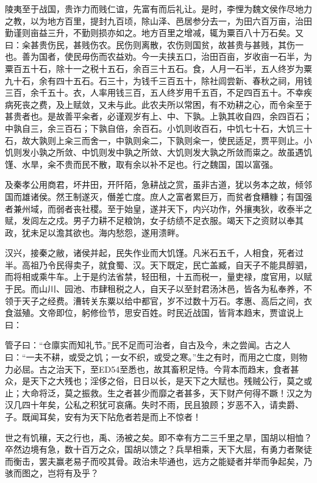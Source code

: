 \documentclass[]{article}
\begin{document}
陵夷至于战国，贵诈力而贱仁谊，先富有而后礼让。是时，李悝为魏文侯作尽地力之教，以为地方百里，提封九百顷，除山泽、邑居参分去一，为田六百万亩，治田勤谨则亩益三升，不勤则损亦如之。地方百里之增减，辄为粟百八十万石矣。又曰：籴甚贵伤民，甚贱伤农。民伤则离散，农伤则国贫，故甚贵与甚贱，其伤一也。善为国者，使民毋伤而农益劝。今一夫挟五口，治田百亩，岁收亩一石半，为粟百五十石，除十一之税十五石，余百三十五石。食，人月一石半，五人终岁为粟九十石，余有四十五石。石三十，为钱千三百五十，除社闾尝新、春秋之祠，用钱三百，余千五十。衣，人率用钱三百，五人终岁用千五百，不足四百五十。不幸疾病死丧之费，及上赋敛，又未与此。此农夫所以常困，有不劝耕之心，而令籴至于甚贵者也。是故善平籴者，必谨观岁有上、中、下孰。上孰其收自四，余四百石；中孰自三，余三百石；下孰自倍，余百石。小饥则收百石，中饥七十石，大饥三十石，故大孰则上籴三而舍一，中孰则籴二，下孰则籴一，使民适足，贾平则止。小饥则发小孰之所敛、中饥则发中孰之所敛、大饥则发大孰之所敛而粜之。故虽遇饥馑、水旱，籴不贵而民不散，取有余以补不足也。行之魏国，国以富强。

及秦孝公用商君，坏井田，开阡陌，急耕战之赏，虽非古道，犹以务本之故，倾邻国而雄诸侯。然王制遂灭，僭差亡度。庶人之富者累巨万，而贫者食糟糠；有国强者兼州域，而弱者丧社稷。至于始皇，遂并天下，内兴功作，外攘夷狄，收泰半之赋，发闾左之戍。男子力耕不足粮饷，女子纺绩不足衣服。竭天下之资财以奉其政，犹未足以澹其欲也。海内愁怨，遂用溃畔。

汉兴，接秦之敝，诸侯并起，民失作业而大饥馑。凡米石五千，人相食，死者过半。高祖乃令民得卖子，就食蜀、汉。天下既定，民亡盖臧，自天子不能具醇驷，而将相或乘牛车。上于是约法省禁，轻田租，十五而税一，量吏禄，度官用，以赋于民。而山川、园池、市肆租税之人，自天子以至封君汤沐邑，皆各为私奉养，不领于天子之经费。漕转关东粟以给中都官，岁不过数十万石。孝惠、高后之间，衣食滋殖。文帝即位，躬修俭节，思安百姓。时民近战国，皆背本趋末，贾谊说上曰：

管子曰：``仓廪实而知礼节。''民不足而可治者，自古及今，未之尝闻。古之人曰：``一夫不耕，或受之饥；一女不织，或受之寒。''生之有时，而用之亡度，则物力必屈。古之治天下，至ED54至悉也，故其畜积足恃。今背本而趋末，食者甚众，是天下之大残也；淫侈之俗，日日以长，是天下之大赋也。残贼公行，莫之或止；大命将泛，莫之振救。生之者甚少而靡之者甚多，天下财产何得不蹶！汉之为汉几四十年矣，公私之积犹可哀痛。失时不雨，民且狼顾；岁恶不入，请卖爵、子。既闻耳矣，安有为天下阽危者若是而上不惊者！

世之有饥穰，天之行也，禹、汤被之矣。即不幸有方二三千里之旱，国胡以相恤？卒然边境有急，数十百万之众，国胡以馈之？兵旱相乘，天下大屈，有勇力者聚徒而衡击，罢夫赢老易子而咬其骨。政治未毕通也，远方之能疑者并举而争起矣，乃骇而图之，岂将有及乎？
\end{document}
